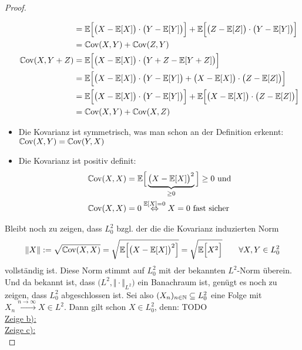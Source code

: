 \documentclass[12pt,a4paper]{article}
\begin{document}
\begin{proof}
\begin{itemize}
\begin{align*}
&=\mathbb{E}\Big[\big(X-\mathbb{E}[X]\big)\cdot\big(Y-\mathbb{E}[Y]\big)\Big]
+\mathbb{E}\Big[\big(Z-\mathbb{E}[Z]\big)\cdot\big(Y-\mathbb{E}[Y]\big)\Big]\\
&=\mathbb{C}\text{ov}(X,Y)+\mathbb{C}\text{ov}(Z,Y)\\
\mathbb{C}\text{ov}(X,Y+Z)
&=\mathbb{E}\Big[\big(X-\mathbb{E}[X]\big)\cdot\big(Y+Z-\mathbb{E}[Y+Z]\big)\Big]\\
&=\mathbb{E}\Big[\big(X-\mathbb{E}[X]\big)\cdot\big(Y-\mathbb{E}[Y]\big)+\big(X-\mathbb{E}[X]\big)\cdot\big(Z-\mathbb{E}[Z]\big)\Big]\\
&=\mathbb{E}\Big[\big(X-\mathbb{E}[X]\big)\cdot\big(Y-\mathbb{E}[Y]\big)\Big]
+\mathbb{E}\Big[\big(X-\mathbb{E}[X]\big)\cdot\big(Z-\mathbb{E}[Z]\big)\Big]\\
&=\mathbb{C}\text{ov}(X,Y)+\mathbb{C}\text{ov}(X,Z)
\end{align*}
\item Die Kovarianz ist symmetrisch, was man schon an der Definition erkennt: $\mathbb{C}\text{ov}(X,Y)=\mathbb{C}\text{ov}(Y,X)$
\item Die Kovarianz ist positiv definit:
\begin{align*}
\mathbb{C}\text{ov}(X,X)&=\mathbb{E}\Big[\underbrace{\big(X-\mathbb{E}[X]\big)^2}_{\geq0}\Big]\geq0\text{ und}\\
\mathbb{C}\text{ov}(X,X)&=0\stackrel{\mathbb{E}[X]=0}{\Leftrightarrow} X=0\text{ fast sicher}
\end{align*}
\end{itemize}
Bleibt noch zu zeigen, dass $L_0^2$ bzgl. der die die Kovarianz induzierten Norm
\begin{align*}
\Vert X\Vert:=\sqrt{\mathbb{C}\text{ov}(X,X)}
=\sqrt{\mathbb{E}\Big[\big(X-\mathbb{E}[X]\big)^2\Big]}
=\sqrt{\mathbb{E}\Big[X^2\Big]}
\qquad\forall X,Y\in L_0^2
\end{align*}
vollständig ist. Diese Norm stimmt auf $L_0^2$ mit der bekannten $L^2$-Norm überein. Und da bekannt ist, dass $\big(L^2,\Vert\cdot\Vert_{L^2}\big)$ ein Banachraum ist, genügt es noch zu zeigen, dass $L_0^2$ abgeschlossen ist.
Sei also $(X_n)_{n\in\mathbb{N}}\subseteq L_0^2$ eine Folge mit
$X_n\stackrel{n\to\infty}{\longrightarrow}X\in L^2$.
Dann gilt schon $X\in L_0^2$, denn: TODO\\




\underline{Zeige b):}\\

\underline{Zeige c):}\\
\end{proof}
\end{document}
